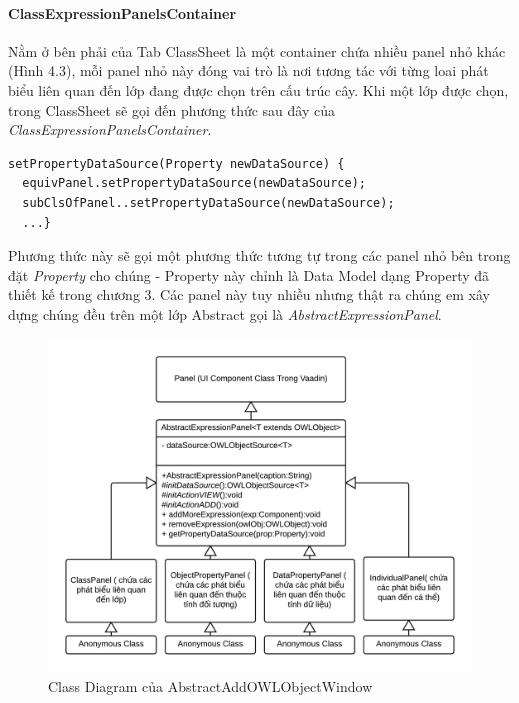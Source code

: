 \paragraph{ClassExpressionPanelsContainer}
Nằm ở bên phải của Tab ClassSheet là một container chứa nhiều panel nhỏ khác (Hình 4.3), mỗi panel nhỏ này đóng vai trò là nơi tương tác với từng loai phát biểu liên quan đến lớp đang được chọn trên cấu trúc cây. Khi một lớp được chọn, trong ClassSheet sẽ gọi đến phương thức sau đây của \textit{ClassExpressionPanelsContainer}.
\begin{verbatim}
setPropertyDataSource(Property newDataSource) {
  equivPanel.setPropertyDataSource(newDataSource);
  subClsOfPanel..setPropertyDataSource(newDataSource);
  ...}
\end{verbatim} 
Phương thức này sẽ gọi một phương thức tương tự trong các panel nhỏ bên trong đặt \textit{Property} cho chúng - Property này chỉnh là Data Model dạng Property đã thiết kế trong chương 3. Các panel này tuy nhiều nhưng thật ra chúng em xây dựng chúng đều trên một lớp Abstract gọi là \textit{AbstractExpressionPanel}.
\begin{figure}[h!]
	\centering
	\includegraphics[width=155mm]{Figures/uml_owleditor_abstractpanel_nobackground.png}
	\caption{Class Diagram của  AbstractAddOWLObjectWindow\label{overflow}}
\end{figure}






